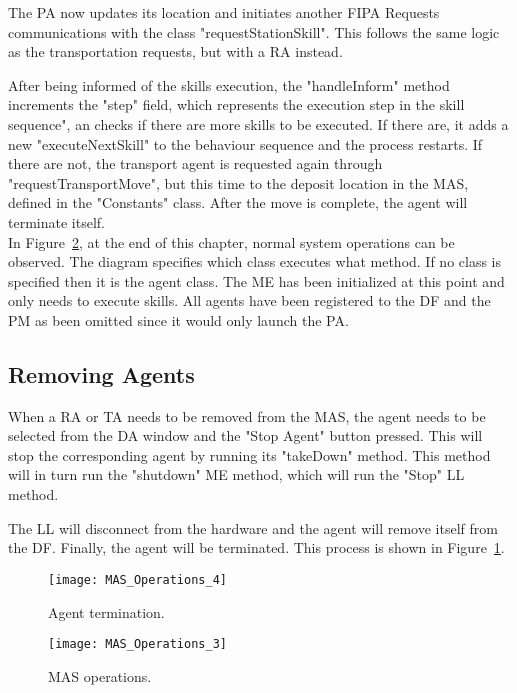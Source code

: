 The \acrshort{PA} now updates its location and initiates another \acrshort{FIPA} Requests communications with the class "requestStationSkill". This follows the same logic as the transportation requests, but with a \acrlong{RA} instead.

After being informed of the skills execution, the "handleInform" method increments the "step" field, which represents the execution step in the skill sequence", an checks if there are more skills to be executed. If there are, it adds a new "executeNextSkill" to the behaviour sequence and the process restarts. If there are not, the transport agent is requested again through "requestTransportMove", but this time to the deposit location in the \acrshort{MAS}, defined in the "Constants" class. After the move is complete, the agent will terminate itself.\\

In Figure~\ref{fig:mas_operations_3}, at the end of this chapter, normal system operations can be observed. The diagram specifies which class executes what method. If no class is specified then it is the agent class. The \acrshort{ME} has been initialized at this point and only needs to execute skills. All agents have been registered to the \acrshort{DF} and the \acrshort{PM} as been omitted since it would only launch the \acrlong{PA}.

\subsection{Removing Agents}

When a \acrlong{RA} or \acrlong{TA} needs to be removed from the \acrshort{MAS}, the agent needs to be selected from the \acrshort{DA} window and the "Stop Agent" button pressed. This will stop the corresponding agent by running its "takeDown" method. This method will in turn run the "shutdown" \acrlong{ME} method, which will run the "Stop" \acrshort{LL} method. 

The \acrshort{LL} will disconnect from the hardware and the agent will remove itself from the \acrshort{DF}. Finally, the agent will be terminated. This process is shown in Figure~\ref{fig:mas_operations_4}.\\

\begin{figure}[h!]
	\centering
	\texttt{[image: MAS\_Operations\_4]}
	\caption{Agent termination.}
	\label{fig:mas_operations_4}
\end{figure}

\begin{figure}[p]
	\centering
	\texttt{[image: MAS\_Operations\_3]}
	\caption{\acrlong{MAS} operations.}
	\label{fig:mas_operations_3}
\end{figure}
